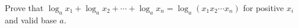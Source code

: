 Prove that $\log_ax_1+\log_ax_2+\cdots+\log_ax_n=\log_a(x_1x_2\cdots x_n)$ for positive $x_i$ and valid base $a$.
